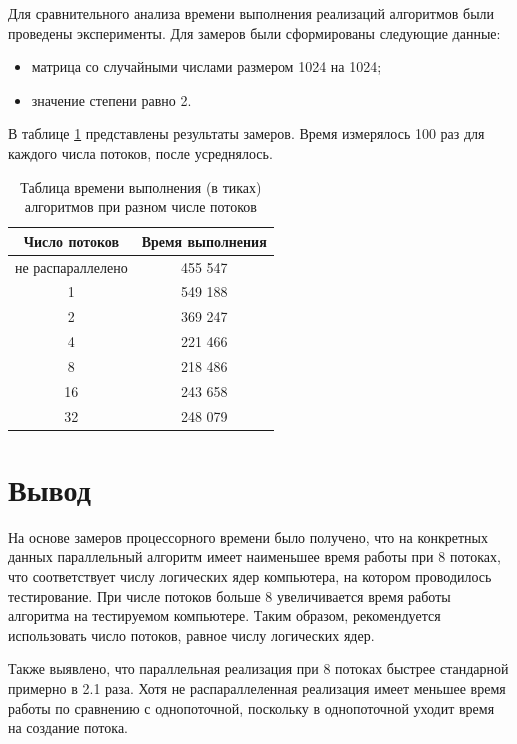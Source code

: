 \documentclass[12pt]{report}
\begin{document}
Для сравнительного анализа времени выполнения реализаций алгоритмов были проведены эксперименты. Для замеров были сформированы следующие данные:
\begin{itemize}
	\item матрица со случайными числами размером 1024 на 1024;
	\item значение степени равно 2.
\end{itemize}

В таблице \ref{time1} представлены результаты замеров. Время измерялось 100 раз для каждого числа потоков, после усреднялось. 

\begin{table} [H]
	\label{time1}
	\caption{Таблица времени выполнения (в тиках) алгоритмов при разном числе потоков}
	\begin{center}
		\begin{tabular}{|c c|} 
			\hline
			Число потоков & Время выполнения \\  
			\hline
			не распараллелено & 455 547 \\
			\hline
			1 & 549 188 \\
			\hline
			2 & 369 247 \\
			\hline
			4 & 221 466 \\
			\hline
			8 & 218 486 \\
			\hline
			16 & 243 658 \\
			\hline
			32 & 248 079 \\
			\hline
		\end{tabular}
	\end{center}
\end{table}

\section{Вывод}

На основе замеров процессорного времени было получено, что на конкретных данных параллельный алгоритм имеет наименьшее время работы при 8 потоках, что соответствует числу логических ядер компьютера, на котором проводилось тестирование. При числе потоков больше 8 увеличивается время работы алгоритма на тестируемом компьютере. Таким образом, рекомендуется использовать число потоков, равное числу логических ядер.

Также выявлено, что параллельная реализация при 8 потоках быстрее стандарной примерно в 2.1 раза. Хотя не распараллеленная реализация имеет меньшее время работы по сравнению с однопоточной, поскольку в однопоточной уходит время на создание потока.
\end{document}
